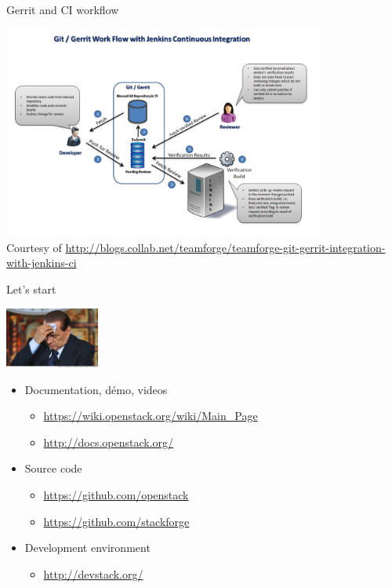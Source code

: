 \begin{frame}{Gerrit and CI workflow}
  \begin{center}
    \includegraphics[height=7cm]{img/Git_gerrit_jenkins.png}
    \\ \tiny Courtesy of \url{http://blogs.collab.net/teamforge/teamforge-git-gerrit-integration-with-jenkins-ci}
  \end{center}
\end{frame}

\begin{frame}{Let's start}
  \begin{center}
    \includegraphics[height=2cm]{img/silvio-berlusconi.jpg}
  \end{center}
  \begin{itemize}
    \item Documentation, démo, videos
      \begin{itemize}
        \item \url{https://wiki.openstack.org/wiki/Main_Page}
        \item \url{http://docs.openstack.org/}
      \end{itemize}
    \item Source code
      \begin{itemize}
        \item \url{https://github.com/openstack}
        \item \url{https://github.com/stackforge}
      \end{itemize}
    \item Development environment
      \begin{itemize}
        \item \url{http://devstack.org/}
      \end{itemize}
  \end{itemize}
\end{frame}

